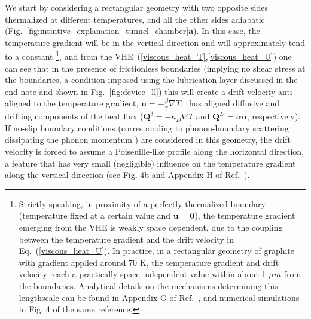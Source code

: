 \documentclass[
prb,
twocolumn,
superscriptaddress,
 amsmath,amssymb,
 aps,
longbibliography,
]{revtex4-2}
\begin{document}
We start by considering a rectangular geometry with two opposite sides thermalized at different temperatures, and all the other sides adiabatic (Fig.~\ref{fig:intuitive_explanation_tunnel_chamber}\textbf{a}). In this case, the temperature gradient will be in the vertical direction and will approximately tend to a constant \footnote{Strictly speaking, in proximity of a perfectly thermalized boundary (temperature fixed at a certain value and $\bm{u}=\bm{0}$),
the temperature gradient emerging from the VHE is weakly space dependent, due to the coupling between the temperature gradient and the drift velocity in Eq.~(\ref{viscous_heat_U}). In practice, in a rectangular geometry of graphite with gradient applied around 70 K, the temperature gradient and drift velocity reach a practically space-independent value within about 1 $\mu m$ from the boundaries. Analytical details on the mechanisms determining this lengthscale can be found in Appendix G of Ref.~\cite{Simoncelli2020}, and numerical simulations in Fig. 4 of the same reference.}, and from the VHE~(\ref{viscous_heat_T},\ref{viscous_heat_U}) one can see that in the presence of frictionless boundaries (implying no shear stress at the boundaries, a condition imposed using the lubrication layer discussed in the end note and shown in Fig.~\ref{fig:device_ll}) this will create a drift velocity anti-aligned to the temperature gradient, $\bm{u}{=}{-}\tfrac{\beta}{\gamma}\nabla T$, thus aligned diffusive and drifting components of the heat flux ($\bm{Q}^\delta=-\kappa_D\nabla T$ and $\bm{Q}^D=\alpha\bm{u}$, respectively).
If no-slip boundary conditions (corresponding to phonon-boundary scattering dissipating the phonon momentum \cite{ziman1960electrons,Simoncelli2020}) are considered in this geometry, the drift velocity is forced to assume a Poiseuille-like profile along the horizontal direction, a feature that has very small (negligible) influence on the temperature gradient along the vertical direction (see Fig. 4b and Appendix H of Ref.~\cite{Simoncelli2020}).
\end{document}
